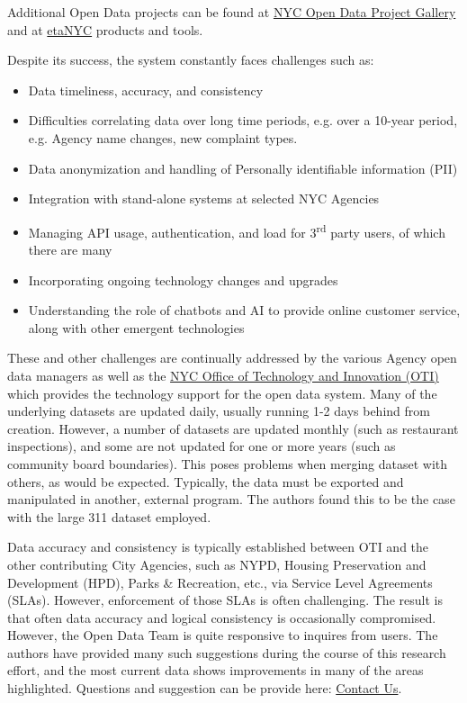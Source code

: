 \documentclass[12pt, titlepage]{article}
\begin{document}
Additional Open Data projects can be found 
at \href{https://opendata.cityofnewyork.us/projects/}{NYC Open Data Project Gallery}
and at \href{https://beta.nyc/beta/products/}{\textbeta etaNYC} products and tools.

Despite its success, the system constantly faces challenges such as:

\begin{itemize}
	\item Data timeliness, accuracy, and consistency
	\item Difficulties correlating data over long time periods, e.g. over a 10-year 
	period, e.g. Agency name changes, new complaint types.
	\item Data anonymization and handling of Personally identifiable information (PII)
	\item Integration with stand-alone systems at selected NYC Agencies
	\item Managing API usage, authentication, and load for 3\textsuperscript{rd} 
	party users, of which there are many
	\item Incorporating ongoing technology changes and upgrades 
	\item Understanding the role of chatbots and AI to provide online 
	customer service, along with other emergent technologies
\end{itemize}

These and other challenges are continually addressed by the various Agency open data managers
as well as the 
\href{https://www.nyc.gov/content/oti/pages/}{NYC Office of Technology and Innovation (OTI)} 
which provides the technology support for the open data system.  
Many of the underlying datasets are updated daily, usually running 1-2 days behind from creation.
However, a number of datasets are updated monthly (such as restaurant inspections), and some are
not updated for one or more years (such as community board boundaries). This poses problems when 
merging dataset with others, as would be expected. Typically, the data must be
exported and manipulated in another, external program. The authors found 
this to be the case with the large 311 dataset employed.

Data accuracy and consistency is typically established between OTI and the other contributing
City Agencies, such as NYPD, Housing Preservation and Development (HPD), Parks \& Recreation, etc.,
via Service Level Agreements (SLAs). However, enforcement of those SLAs is often challenging. The 
result is that often data accuracy and logical consistency is occasionally compromised. 
However, the Open Data Team is quite responsive to inquires from users. The authors have provided many such suggestions during the course of this research effort, 
and the most current data shows improvements in many of the areas highlighted. 
Questions and suggestion  can be provide here: 
\href{https://opendata.cityofnewyork.us/engage/}{Contact Us}.
\end{document}
